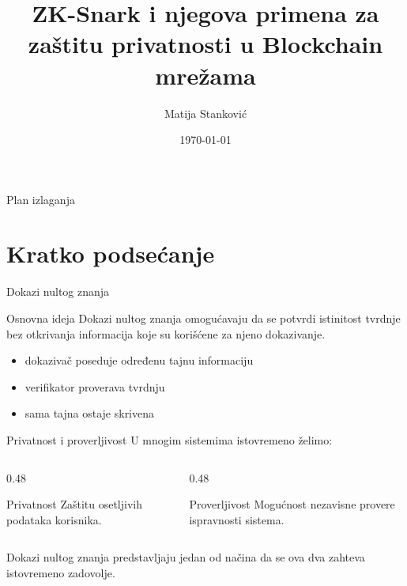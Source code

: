 \documentclass[aspectratio=1610]{beamer}
\title{ZK-Snark i njegova primena za zaštitu privatnosti u Blockchain mrežama}
\author{Matija Stanković}
\date{\today}
\begin{document}
\begin{frame}
\titlepage
\end{frame}

\begin{frame}{Plan izlaganja}
\tableofcontents
\end{frame}

\section{Kratko podsećanje}

\begin{frame}{Dokazi nultog znanja}
\begin{block}{Osnovna ideja}
Dokazi nultog znanja omogućavaju da se potvrdi istinitost tvrdnje bez otkrivanja informacija koje su korišćene za njeno dokazivanje.
\end{block}

\begin{itemize}
    \item dokazivač poseduje određenu tajnu informaciju
    \item verifikator proverava tvrdnju
    \item sama tajna ostaje skrivena
\end{itemize}
\end{frame}

\begin{frame}{Privatnost i proverljivost}
U mnogim sistemima istovremeno želimo:

\bigskip

\begin{columns}

\begin{column}{0.48\textwidth}
\begin{block}{Privatnost}
Zaštitu osetljivih podataka korisnika.
\end{block}
\end{column}

\begin{column}{0.48\textwidth}
\begin{block}{Proverljivost}
Mogućnost nezavisne provere ispravnosti sistema.
\end{block}
\end{column}

\end{columns}

\bigskip

Dokazi nultog znanja predstavljaju jedan od načina da se ova dva zahteva istovremeno zadovolje.
\end{frame}
\end{document}
